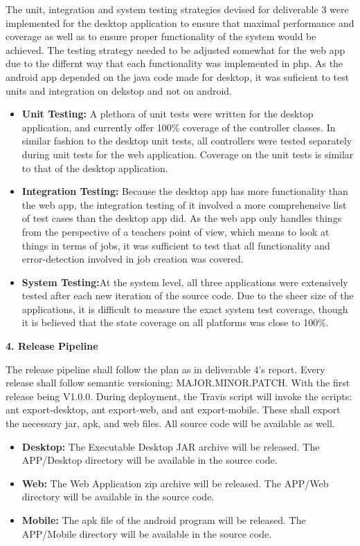 \documentclass[12pt]{article}
\begin{document}
The unit, integration and system testing strategies devised for deliverable 3 were implemented for the desktop application to ensure that maximal performance and coverage as well as  to ensure proper functionality of the system would be achieved. The testing strategy needed to be adjusted somewhat for the web app due to the differnt way that each functionality was implemented in php. As the android app depended on the java code made for desktop, it was suficient to test units and integration on dekstop and not on android.
\begin{itemize}
	\item \textbf{Unit Testing:} A plethora of unit tests were written for the desktop application, and currently offer 100\% coverage of the controller classes. In similar fashion to the desktop unit tests, all controllers were tested separately during unit tests for the web application. Coverage on the unit tests is similar to that of the desktop application.
		
		
	\item \textbf{Integration Testing:} Because the desktop app has more functionality than the web app, the integration testing of it involved a more comprehensive list of test cases than the desktop app did. As the web app only handles things from the perspective of a teachers point of view, which means to look at things in terms of jobs, it was sufficient to test that all functionality and error-detection involved in job creation was covered.
    		
    \item \textbf{System Testing:}At the system level, all three applications were extensively tested after each new iteration of the source code. Due to the sheer size of the applications, it is difficult to measure the exact system test coverage, though it is believed that the state coverage on all platforms was close to 100\%.
\end{itemize}

\textbf{4. Release Pipeline}

The release pipeline shall follow the plan as in deliverable 4's report. Every release shall follow semantic versioning: MAJOR.MINOR.PATCH. With the first release being V1.0.0. During deployment, the Travis script will invoke the scripts: ant export-desktop, ant export-web, and ant export-mobile. These shall export the necessary jar, apk, and web files. All source code will be available as well.
\begin{itemize}
	\item \textbf{Desktop:} The Executable Desktop JAR archive will be released. The APP/Desktop directory will be available in the source code.
	\item \textbf{Web:} The Web Application zip archive will be released. The APP/Web directory will be available in the source code.
	\item \textbf{Mobile:} The apk file of the android program will be released. The APP/Mobile directory will be available in the source code.
\end{itemize}
\end{document}
